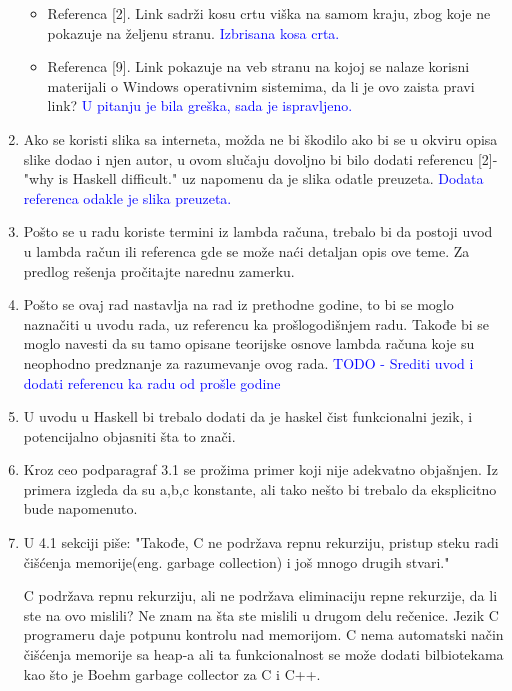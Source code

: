 \documentclass[a4paper]{report}
\newcommand{\odgovor}[1]{\textcolor{blue}{#1}}
\begin{document}
\begin{enumerate}
\begin{itemize}
			\item Referenca [2]. Link sadrži kosu crtu viška na samom kraju, zbog koje ne pokazuje na željenu stranu.
			\odgovor{Izbrisana kosa crta.}
			
			\item Referenca [9]. Link pokazuje na veb stranu na kojoj se nalaze korisni materijali o Windows operativnim sistemima, da li je ovo zaista pravi link?
			\odgovor{U pitanju je bila greška, sada je ispravljeno.}
			
		\end{itemize}
		\item Ako se koristi slika sa interneta, možda ne bi škodilo ako bi se u okviru opisa slike dodao i njen autor, u ovom slučaju dovoljno bi bilo dodati referencu [2]-"why is Haskell difficult." uz napomenu da je slika odatle preuzeta.
		\odgovor{Dodata referenca odakle je slika preuzeta.}
		
		\item Pošto se u radu koriste termini iz lambda računa, trebalo bi da postoji uvod u lambda račun ili referenca gde se može naći detaljan opis ove teme. Za predlog rešenja pročitajte narednu zamerku.
		
		\item Pošto se ovaj rad nastavlja na rad iz prethodne godine, to bi se moglo naznačiti u uvodu rada, uz referencu ka prošlogodišnjem radu. Takođe bi se moglo navesti da su tamo opisane teorijske osnove lambda računa koje su neophodno predznanje za razumevanje ovog rada.
		\odgovor{TODO - Srediti uvod i dodati referencu ka radu od prošle godine}
		
		\item U uvodu u Haskell bi trebalo dodati da je haskel čist funkcionalni jezik, i potencijalno objasniti šta to znači.
		
		\item Kroz ceo podparagraf 3.1 se prožima primer koji nije adekvatno objašnjen. Iz primera izgleda da su a,b,c konstante, ali tako nešto bi trebalo da eksplicitno bude napomenuto.
		
		\item U 4.1 sekciji piše:
		"Takođe, C ne podržava repnu rekurziju, pristup steku radi čišćenja memorije(eng. garbage collection) i još mnogo drugih stvari."
		
		C podržava repnu rekurziju, ali ne podržava eliminaciju repne rekurzije, da li ste na ovo mislili? Ne znam na šta ste mislili u drugom delu rečenice. Jezik C programeru daje potpunu kontrolu nad memorijom. C nema automatski način čišćenja memorije sa heap-a ali ta funkcionalnost se može dodati bilbiotekama kao što je Boehm garbage collector za C i C++.
		
		
	\end{enumerate}
	
\end{document}
